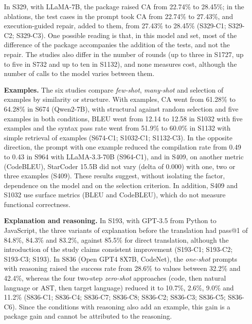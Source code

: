 In S329, with LLaMA-7B, the package raised CA from 22.74\% to 28.45\%; in the ablations, the test cases in the prompt took CA from 22.74\% to 27.43\%, and execution-guided repair, added to them, from 27.43\% to 28.45\% (S329-C1; S329-C2; S329-C3).
One possible reading is that, in this model and set, most of the difference of the package accompanies the addition of the tests, and not the repair. The studies also differ in the number of rounds (up to three in S1727, up to five in S732 and up to ten in S1132), and none measures cost, although the number of calls to the model varies between them.

\textbf{Examples.} The six studies compare \textit{few-shot}, \textit{many-shot} and selection of examples by similarity or structure.
With examples, CA went from 61.28\% to 64.28\% in S674 (Qwen2-7B), with structural against random selection and five examples in both conditions, BLEU went from 12.14 to 12.58 in S1032 with five examples and the syntax pass rate went from 51.9\% to 60.0\% in S1132 with simple retrieval of examples (S674-C1; S1032-C1; S1132-C3).
In the opposite direction, the prompt with one example reduced the compilation rate from 0.49 to 0.43 in S964 with LLaMA-3.3-70B (S964-C1), and in S409, on another metric (CodeBLEU), StarCoder 15.5B did not vary (delta of 0.000) with one, two or three examples (S409).
These results suggest, without isolating the factor, dependence on the model and on the selection criterion. In addition, S409 and S1032 use surface metrics (BLEU and CodeBLEU), which do not measure functional correctness.

\textbf{Explanation and reasoning.}
In S193, with GPT-3.5 from Python to JavaScript, the three variants of explanation before the translation had pass@1 of 84.8\%, 84.3\% and 83.2\%, against 85.5\% for direct translation, although the introduction of the study claims consistent improvement (S193-C1; S193-C2; S193-C3; S193).
In S836 (Open GPT4 8X7B, CodeNet), the \textit{one-shot} prompts with reasoning raised the success rate from 28.6\% to values between 32.2\% and 42.4\%, whereas the four two-step \textit{zero-shot} approaches (code, then natural language or AST, then target language) reduced it to 10.7\%, 2.6\%, 9.0\% and 11.2\% (S836-C1; S836-C4; S836-C7; S836-C8; S836-C2; S836-C3; S836-C5; S836-C6).
Since the conditions with reasoning also add an example, this gain is a package gain and cannot be attributed to the reasoning.

